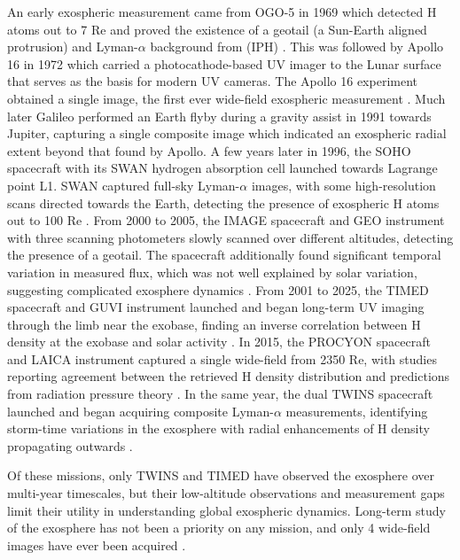 \documentclass[pdflatex,twocolumn,sn-mathphys-num]{sn-jnl}
\begin{document}
  An early exospheric measurement came from OGO-5 in 1969 which detected H atoms out to 7 Re and proved the existence of a geotail (a Sun-Earth aligned protrusion) and Lyman-$\alpha$ background from (IPH) \cite{ogo5} \cite{baliukin}.
  This was followed by Apollo 16 in 1972 which carried a photocathode-based UV imager to the Lunar surface that serves as the basis for modern UV cameras. The Apollo 16 experiment obtained a single image, the first ever wide-field exospheric measurement \cite{apollo2} \cite{apollo}.
  Much later Galileo performed an Earth flyby during a gravity assist in 1991 towards Jupiter, capturing a single composite image which indicated an exospheric radial extent beyond that found by Apollo.
  A few years later in 1996, the SOHO spacecraft with its SWAN hydrogen absorption cell \cite{soho_swan} launched towards Lagrange point L1.  SWAN captured full-sky Lyman-$\alpha$ images, with some high-resolution scans directed towards the Earth, detecting the presence of exospheric H atoms out to 100 Re \cite{baliukin}.
  From 2000 to 2005, the IMAGE spacecraft and GEO instrument with three scanning photometers slowly scanned over different altitudes, detecting the presence of a geotail.  The spacecraft additionally found significant temporal variation in measured flux, which was not well explained by solar variation, suggesting complicated exosphere dynamics \cite{ostgaard}.
  From 2001 to 2025, the TIMED spacecraft and GUVI instrument launched and began long-term UV imaging through the limb near the exobase, finding an inverse correlation between H density at the exobase and solar activity \cite{timed_guvi2}.
  In 2015, the PROCYON spacecraft and LAICA instrument captured a single wide-field from 2350 Re, with studies reporting agreement between the retrieved H density distribution and predictions from radiation pressure theory \cite{procyon_laica}.
  In the same year, the dual TWINS spacecraft launched and began acquiring composite Lyman-$\alpha$ measurements, identifying storm-time variations in the exosphere with radial enhancements of H density propagating outwards \cite{gonzalo_storm} \cite{zoennchen2011}.


  Of these missions, only TWINS and TIMED have observed the exosphere over multi-year timescales, but their low-altitude observations and measurement gaps limit their utility in understanding global exospheric dynamics.
  Long-term study of the exosphere has not been a priority on any mission, and only 4 wide-field images have ever been acquired \cite{apollo2} \cite{galileo} \cite{procyon_laica2} \cite{ogo5}.
\end{document}
